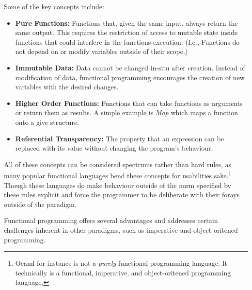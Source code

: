 \documentclass{l4proj}
\begin{document}
Some of the key concepts include:

\begin{itemize}
    \item \textbf{Pure Functions:} Functions that, given the same input, always return the same output.
    This requires the restriction of access to mutable state inside functions that could interfere in the functions execution.
    (I.e., Functions do not depend on or modify variables outside of their scope.)
    \item \textbf{Immutable Data:} Data cannot be changed in-situ after creation.
    Instead of modification of data, functional programming encourages the creation of new variables with the desired changes.
    \item \textbf{Higher Order Functions:} Functions that can take functions as arguments or return them as results.
    A simple example is \emph{Map} which maps a function onto a give structure.
    \item \textbf{Referential Transparency:} The property that an expression can be replaced with its value without changing the program's behaviour. 
\end{itemize}

All of these concepts can be considered spectrums rather than hard rules, as many popular functional languages bend these concepts for usabilities sake.\footnote{Ocaml for instance is not a \emph{purely} functional programming language. It technically is a functional, imperative, and object-oritened programming language.}
Though these languages do make behaviour outside of the norm specified by these rules explicit and force the programmer to be deliberate with their forays outside of the paradigm.

Functional programming offers several advantages and addresses certain challenges inherent in other paradigms, such as imperative and object-oritened programming. 
\end{document}
